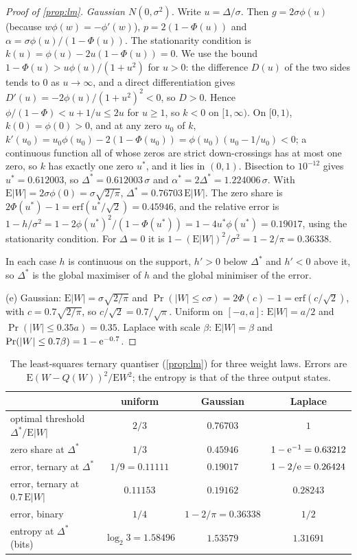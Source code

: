 \documentclass[11pt]{article}
\theoremstyle{definition}\newtheorem{definition}[theorem]{Definition}
\theoremstyle{remark}\newtheorem{remark}[theorem]{Remark}
\begin{document}
\begin{proof}[Proof of \cref{prop:lm}]
\emph{Gaussian $N(0,\sigma^2)$.} Write $u=\Delta/\sigma$. Then $g=2\sigma\phi(u)$ (because $w\phi(w)=-\phi'(w)$), $p=2(1-\Phi(u))$ and $\alpha=\sigma\phi(u)/(1-\Phi(u))$. The stationarity condition is $k(u)=\phi(u)-2u(1-\Phi(u))=0$. We use the bound $1-\Phi(u)>u\phi(u)/(1+u^2)$ for $u>0$: the difference $D(u)$ of the two sides tends to $0$ as $u\to\infty$, and a direct differentiation gives $D'(u)=-2\phi(u)/(1+u^2)^2<0$, so $D>0$. Hence $\phi/(1-\Phi)<u+1/u\le2u$ for $u\ge1$, so $k<0$ on $[1,\infty)$. On $[0,1)$, $k(0)=\phi(0)>0$, and at any zero $u_0$ of $k$, $k'(u_0)=u_0\phi(u_0)-2(1-\Phi(u_0))=\phi(u_0)(u_0-1/u_0)<0$; a continuous function all of whose zeros are strict down-crossings has at most one zero, so $k$ has exactly one zero $u^*$, and it lies in $(0,1)$. Bisection to $10^{-12}$ gives $u^*=0.612003$, so $\Delta^*=0.612003\,\sigma$ and $\alpha^*=2\Delta^*=1.224006\,\sigma$. With $\mathrm E|W|=2\sigma\phi(0)=\sigma\sqrt{2/\pi}$, $\Delta^*=0.76703\,\mathrm E|W|$. The zero share is $2\Phi(u^*)-1=\mathrm{erf}(u^*/\sqrt2)=0.45946$, and the relative error is $1-h/\sigma^2=1-2\phi(u^*)^2/(1-\Phi(u^*))=1-4u^*\phi(u^*)=0.19017$, using the stationarity condition. For $\Delta=0$ it is $1-(\mathrm E|W|)^2/\sigma^2=1-2/\pi=0.36338$.

In each case $h$ is continuous on the support, $h'>0$ below $\Delta^*$ and $h'<0$ above it, so $\Delta^*$ is the global maximiser of $h$ and the global minimiser of the error.

(e) Gaussian: $\mathrm E|W|=\sigma\sqrt{2/\pi}$ and $\Pr(|W|\le c\sigma)=2\Phi(c)-1=\mathrm{erf}(c/\sqrt2)$, with $c=0.7\sqrt{2/\pi}$, so $c/\sqrt2=0.7/\sqrt\pi$. Uniform on $[-a,a]$: $\mathrm E|W|=a/2$ and $\Pr(|W|\le0.35a)=0.35$. Laplace with scale $\beta$: $\mathrm E|W|=\beta$ and $\Pr(|W|\le0.7\beta)=1-\mathrm e^{-0.7}$.
\end{proof}

\begin{table}[t]
\centering\small
\caption{The least-squares ternary quantiser (\cref{prop:lm}) for three weight laws. Errors are $\mathrm E(W-Q(W))^2/\mathrm EW^2$; the entropy is that of the three output states.}\label{tab:lm}
\begin{tabular}{@{}lccc@{}}
\toprule
 & uniform & Gaussian & Laplace\\
\midrule
optimal threshold $\Delta^*/\mathrm E|W|$ & $2/3$ & $0.76703$ & $1$\\
zero share at $\Delta^*$ & $1/3$ & $0.45946$ & $1-\mathrm e^{-1}=0.63212$\\
error, ternary at $\Delta^*$ & $1/9=0.11111$ & $0.19017$ & $1-2/\mathrm e=0.26424$\\
error, ternary at $0.7\,\mathrm E|W|$ & $0.11153$ & $0.19162$ & $0.28243$\\
error, binary & $1/4$ & $1-2/\pi=0.36338$ & $1/2$\\
entropy at $\Delta^*$ (bits) & $\log_{2}3=1.58496$ & $1.53579$ & $1.31691$\\
\bottomrule
\end{tabular}
\end{table}
\end{document}
